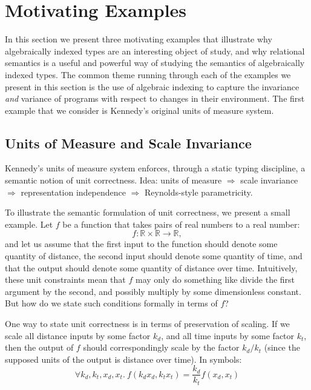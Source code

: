 \section{Motivating Examples}
\label{sec:motivating-examples}

In this section we present three motivating examples that illustrate
why algebraically indexed types are an interesting object of study,
and why relational semantics is a useful and powerful way of studying
the semantics of algebraically indexed types. The common theme running
through each of the examples we present in this section is the use of
algebraic indexing to capture the invariance \emph{and} variance of
programs with respect to changes in their environment. The first
example that we consider is Kennedy's original units of measure
system.

\subsection{Units of Measure and Scale Invariance}
\label{sec:units-of-measure-example-intro}

Kennedy's units of measure system enforces, through a static typing
discipline, a semantic notion of unit correctness. Idea: units of
measure $\Rightarrow$ scale invariance $\Rightarrow$ representation
independence $\Rightarrow$ Reynolds-style parametricity.

To illustrate the semantic formulation of unit correctness, we present
a small example.  Let $f$ be a function that takes pairs of real
numbers to a real number:
\begin{displaymath}
  f : \mathbb{R} \times \mathbb{R} \to \mathbb{R},
\end{displaymath}
and let us assume that the first input to the function should denote
some quantity of distance, the second input should denote some
quantity of time, and that the output should denote some quantity of
distance over time. Intuitively, these unit constraints mean that $f$
may only do something like divide the first argument by the second,
and possibly multiply by some dimensionless constant. But how do we
state such conditions formally in terms of $f$?

One way to state unit correctness is in terms of preservation of
scaling. If we scale all distance inputs by some factor $k_d$, and all
time inputs by some factor $k_t$, then the output of $f$ should
correspondingly scale by the factor $k_d/k_t$ (since the supposed
units of the output is distance over time). In symbols:
\begin{displaymath}
  \forall k_d, k_t, x_d, x_t.\ f(k_dx_d, k_tx_t) = \frac{k_d}{k_t}f(x_d,x_t)
\end{displaymath}


